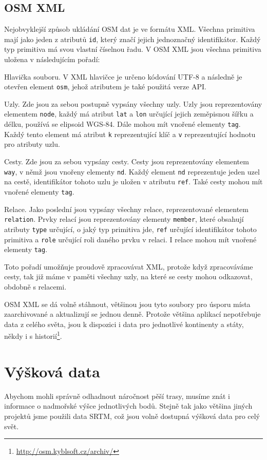 \subsection{OSM XML}
Nejobvyklejší způsob ukládání OSM dat je ve formátu XML. Všechna primitiva mají
jako jeden z atributů \verb|id|, který značí jejich jednoznačný identifikátor.
Každý typ primitiva má svou vlastní číselnou řadu. V OSM XML jsou
všechna primitiva uložena v následujícím pořadí:

{\tuc Hlavička souboru.} V XML hlavičce je určeno kódování UTF-8 a následně je
otevřen element \verb|osm|, jehož atributem je také použitá verze API. 

{\tuc Uzly.} Zde jsou za sebou postupně vypsány všechny uzly. Uzly jsou
reprezentovány elementem \verb|node|, každý má atribut \verb|lat| a \verb|lon|
určující jejich zeměpisnou šířku a délku, používá se elipsoid WGS-84. Dále mohou
mít vnořené elementy \verb|tag|. Každý tento element má atribut \verb|k|
reprezentující klíč a \verb|v| reprezentující hodnotu pro atributy uzlu.

{\tuc Cesty.} Zde jsou za sebou vypsány cesty. Cesty jsou reprezentovány
elementem \verb|way|, v němž jsou vnořeny elementy \verb|nd|. Každý element
\verb|nd| reprezentuje jeden uzel na cestě, identifikátor tohoto uzlu je uložen
v atributu \verb|ref|. Také cesty mohou mít vnořené elementy \verb|tag|.

{\tuc Relace.} Jako poslední jsou vypsány všechny relace, reprezentované
elementem \verb|relation|. Prvky relací jsou reprezentovány elementy
\verb|member|, které obsahují atributy \verb|type| určující, o jaký typ
primitiva jde, \verb|ref| určující identifikátor tohoto primitiva a \verb|role|
určující roli daného prvku v relaci. I relace mohou mít vnořené elementy
\verb|tag|.

Toto pořadí umožňuje proudově zpracovávat XML, protože když zpracováváme cesty,
tak již máme v paměti všechny uzly, na které se cesty mohou odkazovat, obdobně
s relacemi. 

OSM XML se dá volně stáhnout, většinou jsou tyto soubory pro úsporu místa
zaarchivované a aktualizují se jednou denně. Protože většina aplikací
nepotřebuje data z celého světa, jsou k dispozici i data pro jednotlivé
kontinenty a státy, někdy i s
historií\footnote{\url{http://osm.kyblsoft.cz/archiv/}}. 


\section{Výšková data}
Abychom mohli správně odhadnout náročnost pěší trasy, musíme znát i informace o
nadmořské výšce jednotlivých bodů. Stejně tak jako většina jiných projektů jsme
použili data SRTM\cite{srtmweb}, což jsou volně dostupná výšková data pro celý
svět. %
